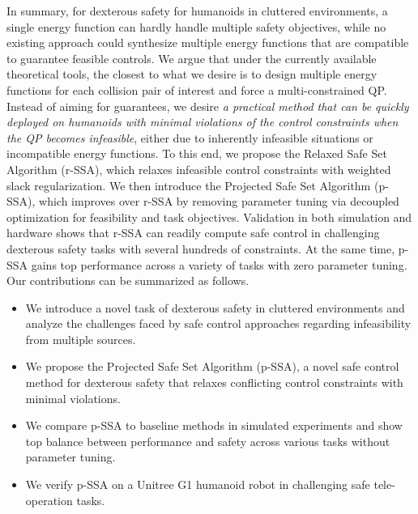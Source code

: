 
In summary, for dexterous safety for humanoids in cluttered environments, a single energy function can hardly handle multiple safety objectives, while no existing approach could synthesize multiple energy functions that are compatible to guarantee feasible controls.
We argue that under the currently available theoretical tools, the closest to what we desire is to design multiple energy functions for each collision pair of interest and force a multi-constrained QP.
Instead of aiming for guarantees, we desire \textit{a practical method that can be quickly deployed on humanoids with minimal violations of the control constraints when the QP becomes infeasible}, either due to inherently infeasible situations or incompatible energy functions.
To this end, we propose the Relaxed Safe Set Algorithm (r-SSA), which relaxes infeasible control constraints with weighted slack regularization.
We then introduce the Projected Safe Set Algorithm (p-SSA), which improves over r-SSA by removing parameter tuning via decoupled optimization for feasibility and task objectives.
Validation in both simulation and hardware shows that r-SSA can readily compute safe control in challenging dexterous safety tasks with several hundreds of constraints.
At the same time, p-SSA gains top performance across a variety of tasks with zero parameter tuning.
Our contributions can be summarized as follows.
\begin{itemize}
    \item We introduce a novel task of dexterous safety in cluttered environments and analyze the challenges faced by safe control approaches regarding infeasibility from multiple sources.
    \item We propose the Projected Safe Set Algorithm (p-SSA), a novel safe control method for dexterous safety that relaxes conflicting control constraints with minimal violations.
    \item We compare p-SSA to baseline methods in simulated experiments and show top balance between performance and safety across various tasks without parameter tuning.
    \item We verify p-SSA on a Unitree G1 humanoid robot in challenging safe tele-operation tasks.
\end{itemize}


